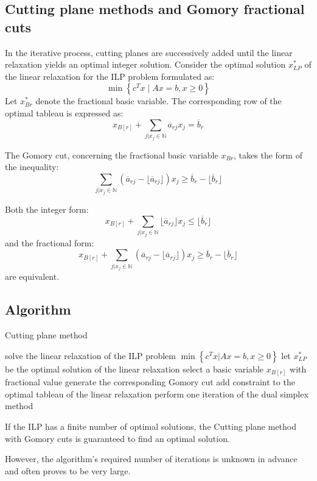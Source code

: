 \subsection{Cutting plane methods and Gomory fractional cuts}
In the iterative process, cutting planes are successively added until the linear relaxation yields an optimal integer solution.
Consider the optimal solution $x^{*}_{LP}$ of the linear relaxation for the ILP problem formulated as:
\[ \min \left\{ c^T x \mid Ax = b, x \geq 0 \right\} \]
Let $x^{*}_{B{r}}$ denote the fractional basic variable. 
The corresponding row of the optimal tableau is expressed as:
\[ x_{B[r]} + \displaystyle \sum_{j \vert x_j \in \mathbb{N}} \overline{a}_{rj} x_j = \overline{b}_r \]
\begin{definition}
    The Gomory cut, concerning the fractional basic variable $x_{B{r}}$, takes the form of the inequality:
    \[ \displaystyle \sum_{j \vert x_j \in \mathbb{N}} \left( \overline{a}_{rj} - \lfloor \overline{a}_{rj} \rfloor \right) x_j \geq \overline{b}_r - \lfloor \overline{b}_r \rfloor \]
\end{definition}
\begin{property}
    Both the integer form:
    \[ \displaystyle x_{B[r]} + \sum_{j \vert x_j \in \mathbb{N}} \lfloor\overline{a}_{rj}\rfloor x_j \leq \lfloor\overline{b}_r\rfloor \]
    and the fractional form:
    \[ \displaystyle x_{B[r]} + \sum_{j \vert x_j \in \mathbb{N}} \left( \overline{a}_{rj} - \lfloor \overline{a}_{rj} \rfloor \right) x_j \geq \overline{b}_r - \lfloor \overline{b}_r \rfloor \]
    are equivalent.
\end{property}

\subsection{Algorithm}
\begin{algorithm}[H]
    \caption{Cutting plane method}
        \begin{algorithmic}[1]
            \State solve the linear relaxation of the ILP problem $\min\left\{c^T x \vert Ax = b, x \geq 0 \right\}$
            \State let $x^{*}_{LP}$ be the optimal solution of the linear relaxation
                \State select a basic variable $x_{B[r]}$ with fractional value
                \State generate the corresponding Gomory cut
                \State add constraint to the optimal tableau of the linear relaxation
                \State perform one iteration of the dual simplex method
            \EndWhile
        \end{algorithmic}
\end{algorithm}
\begin{theorem}
    If the ILP has a finite number of optimal solutions, the Cutting plane method with Gomory cuts is guaranteed to find an optimal solution.
\end{theorem}
However, the algorithm's required number of iterations is unknown in advance and often proves to be very large.

